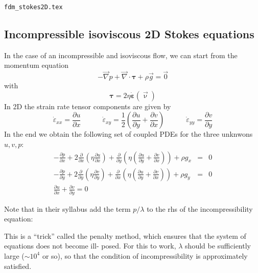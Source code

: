 \begin{flushright} {\tiny {\color{gray} \tt fdm\_stokes2D.tex}} \end{flushright}

\subsection{Incompressible isoviscous 2D Stokes equations}


In the case of an incompressible and isoviscous flow, we can start  from 
the momentum equation
\begin{equation}
-\vec\nabla p + \vec\nabla \cdot {\bm \tau} + \rho \vec{g} = \vec{0}
\end{equation}
with 
\[
{\bm \tau} = 2 \eta \dot{\bm \varepsilon}(\vec\upnu)
\]
In 2D the strain rate tensor components are given by
\[
\dot{\varepsilon}_{xx}=\frac{\partial u}{\partial x}
\quad\quad\quad
\dot{\varepsilon}_{xy}=\frac{1}{2} \left( \frac{\partial u}{\partial y} + \frac{\partial v}{\partial x} \right)
\quad\quad\quad
\dot{\varepsilon}_{yy}=\frac{\partial v}{\partial y}
\]
In the end we obtain the following set of coupled PDEs for the three 
unknwons $u,v,p$:
\begin{eqnarray}
-\frac{\partial p}{\partial x}  
+ 2 \frac{\partial }{\partial x} \left(\eta \frac{\partial u}{\partial x}  \right) 
+\frac{\partial}{\partial y}\left(\eta (\frac{\partial u}{\partial y}+\frac{\partial v}{\partial x}) \right)
+  \rho g_x &=&0 \\
-\frac{\partial p}{\partial y}  
+ 2 \frac{\partial }{\partial y} \left(\eta \frac{\partial v}{\partial y}  \right) 
+\frac{\partial}{\partial x}\left(\eta (\frac{\partial u}{\partial y}+\frac{\partial v}{\partial x}) \right)
+  \rho g_y  &=& 0 \\
\frac{\partial u}{\partial x} + \frac{\partial v}{\partial y}  = 0 
\end{eqnarray}

Note that in their syllabus \textcite{beka} add the term $p/\lambda$ to the rhs
of the incompressibility equation: 
\begin{displayquote}
{\color{darkgray}
This is a ``trick'' called
the penalty method, which ensures that the system of equations does not become ill-
posed. For this to work, $\lambda$ should be sufficiently large 
($\sim 10^4$ or so), so that the condition
of incompressibility is approximately satisfied.}
\end{displayquote} 


